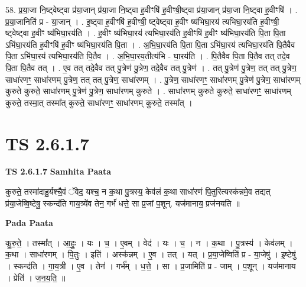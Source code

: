 \documentclass[17pt]{extarticle}
\begin{document}
58. प्र॒या॒जा नि॒ष्ट्वेष्ट्वा प्र॑या॒जान् प्र॑या॒जा नि॒ष्ट्वा ह॒वीꣳषि॑ ह॒वीꣳषी॒ष्ट्वा प्र॑या॒जान् प्र॑या॒जा नि॒ष्ट्वा ह॒वीꣳषि॑ । . प्र॒या॒जानिति॑ प्र - या॒जान् । . इ॒ष्ट्वा ह॒वीꣳषि॑ ह॒वीꣳषी॒ ष्ट्वेष्ट्वा ह॒वीꣳ ष्य॑भिघा॒रय॑ त्यभिघा॒रय॑ति ह॒वीꣳषी॒ ष्ट्वेष्ट्वा 
ह॒वीꣳ ष्य॑भिघा॒रय॑ति । . ह॒वीꣳ ष्य॑भिघा॒रय॑ त्यभिघा॒रय॑ति ह॒वीꣳषि॑ ह॒वीꣳ ष्य॑भिघा॒रय॑ति पि॒ता पि॒ता ऽभि॑घा॒रय॑ति ह॒वीꣳषि॑ ह॒वीꣳ ष्य॑भिघा॒रय॑ति पि॒ता । . अ॒भि॒घा॒रय॑ति पि॒ता पि॒ता ऽभि॑घा॒रय॑ त्यभिघा॒रय॑ति पि॒तैवैव पि॒ता ऽभि॑घा॒रय॑ त्यभिघा॒रय॑ति पि॒तैव । . अ॒भि॒घा॒रय॒तीत्य॑भि - घा॒रय॑ति । . पि॒तैवैव पि॒ता पि॒तैव तत् तदे॒व पि॒ता पि॒तैव तत् । . ए॒व तत् तदे॒वैव तत् पु॒त्रेण॑ पु॒त्रेण॒ तदे॒वैव तत् पु॒त्रेण॑ । . तत् पु॒त्रेण॑ पु॒त्रेण॒ तत् तत् पु॒त्रेण॒ साधा॑रणꣳ॒॒ साधा॑रणम् पु॒त्रेण॒ तत् तत् पु॒त्रेण॒ साधा॑रणम् । . पु॒त्रेण॒ साधा॑रणꣳ॒॒ साधा॑रणम् पु॒त्रेण॑ पु॒त्रेण॒ साधा॑रणम् कुरुते कुरुते॒ साधा॑रणम् पु॒त्रेण॑ पु॒त्रेण॒ साधा॑रणम् कुरुते । . साधा॑रणम् कुरुते कुरुते॒ साधा॑रणꣳ॒॒ साधा॑रणम् कुरुते॒ तस्मा॒त् तस्मा᳚त् कुरुते॒ साधा॑रणꣳ॒॒ साधा॑रणम् कुरुते॒ तस्मा᳚त् । \newline
\pagebreak
{}

\section{ TS 2.6.1.7 }

\textbf{TS 2.6.1.7 } \newline
\textbf{Samhita Paata} \newline

कुरुते॒ तस्मा॑दाहु॒र्यश्चै॒वं ॅवेद॒ यश्च॒ न क॒था पु॒त्रस्य॒ केव॑लं क॒था साधा॑रणं पि॒तुरित्यस्क॑न्नमे॒व तद्यत् प्र॑या॒जेष्वि॒ष्टेषु॒ स्कन्द॑ति गाय॒त्र्ये॑व तेन॒ गर्भं॑ धत्ते॒ सा प्र॒जां प॒शून्. यज॑मानाय॒ प्रज॑नयति ॥ \newline

\textbf{Pada Paata} \newline

कु॒रु॒ते॒ । तस्मा᳚त् । आ॒हुः॒ । यः । च॒ । ए॒वम् । वेद॑ । यः । च॒ । न । क॒था । पु॒त्रस्य॑ । केव॑लम् । क॒था । साधा॑रणम् । पि॒तुः । इति॑ । अस्क॑न्नम् । ए॒व । तत् । यत् । प्र॒या॒जेष्विति॑ प्र - या॒जेषु॑ । इ॒ष्टेषु॑ । स्कन्द॑ति । गा॒य॒त्री । ए॒व । तेन॑ । गर्भ᳚म् । ध॒त्ते॒ । सा । प्र॒जामिति॑ प्र - जाम् । प॒शून् । यज॑मानाय । प्रेति॑ । ज॒न॒य॒ति॒ ॥  \newline
\end{document}

